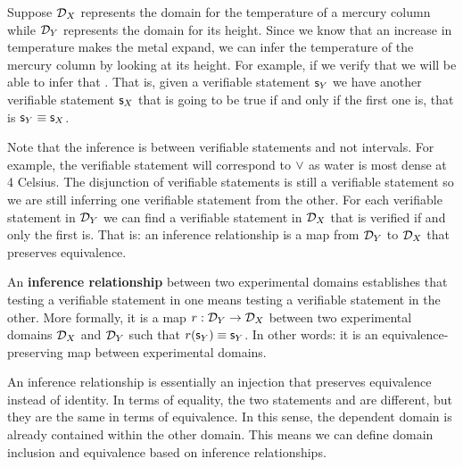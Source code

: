 \documentclass[11pt,letterpaper,fleqn]{memoir} %
\begin{document}
Suppose $\mathcal{D}_X$ represents the domain for the temperature of a mercury column while $\mathcal{D}_Y$ represents the domain for its height. Since we know that an increase in temperature makes the metal expand, we can infer the temperature of the mercury column by looking at its height. For example, if we verify that  we will be able to infer that . That is, given a verifiable statement $\mathsf{s}_Y$ we have another verifiable statement $\mathsf{s}_X$ that is going to be true if and only if the first one is, that is $\mathsf{s}_Y\equiv\mathsf{s}_X$.

Note that the inference is between verifiable statements and not intervals. For example, the verifiable statement  will correspond to $\vee$ as water is most dense at 4 Celsius. The disjunction of verifiable statements is still a verifiable statement so we are still inferring one verifiable statement from the other. For each verifiable statement in $\mathcal{D}_Y$ we can find a verifiable statement in $\mathcal{D}_X$ that is verified if and only the first is. That is: an inference relationship is a map from $\mathcal{D}_Y$ to $\mathcal{D}_X$ that preserves equivalence.

\begin{mathSection}
	\begin{defn}
		An \textbf{inference relationship} between two experimental domains establishes that testing a verifiable statement in one means testing a verifiable statement in the other. More formally, it is a map $r: \mathcal{D}_Y \to \mathcal{D}_X$ between two experimental domains $\mathcal{D}_X$ and $\mathcal{D}_Y$ such that $r(\mathsf{s}_Y) \equiv \mathsf{s}_Y$. In other words: it is an equivalence-preserving map between experimental domains.
	\end{defn}
\end{mathSection}

An inference relationship is essentially an injection that preserves equivalence instead of identity. In terms of equality, the two statements  and  are different, but they are the same in terms of equivalence. In this sense, the dependent domain is already contained within the other domain. This means we can define domain inclusion and equivalence based on inference relationships.
\end{document}
